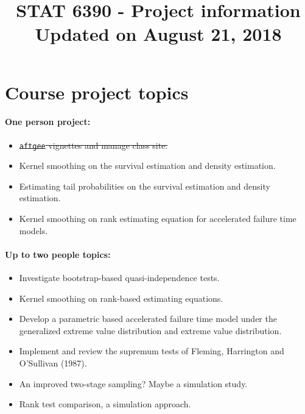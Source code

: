 \documentclass[a4paper,10pt]{article}
\title{STAT 6390 - Project information\\\vspace{.5cm}
\normalsize	Updated on August 21, 2018}
\date{}
\begin{document}
\maketitle
\section*{Course project topics}
\paragraph{One person project:}
\begin{itemize}
\item \sout{\texttt{aftgee} vignettes and manage class site.}
\item Kernel smoothing on the survival estimation and density estimation.
\item Estimating tail probabilities on the survival estimation and density estimation.
\item Kernel smoothing on rank estimating equation for accelerated failure time models.
\end{itemize}
\paragraph{Up to two people topics:}
\begin{itemize}
\item Investigate bootstrap-based quasi-independence tests. 
\item Kernel smoothing on rank-based estimating equations.
\item Develop a parametric based accelerated failure time model under the generalized extreme value distribution and extreme value distribution.
\item Implement and review the supremum tests of Fleming, Harrington and O'Sullivan (1987).
\item An improved two-stage sampling? Maybe a simulation study.
\item Rank test comparison, a simulation approach.
\end{itemize}

\newpage
\end{document}
